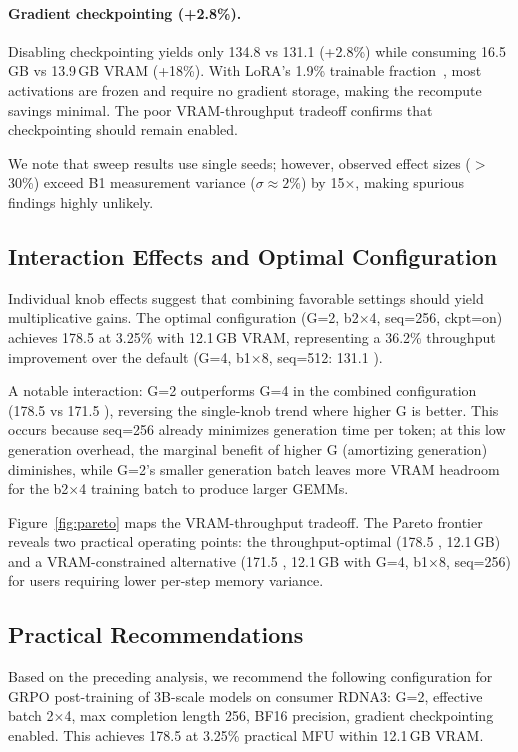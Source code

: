 \paragraph{Gradient checkpointing (+2.8\%).} Disabling checkpointing yields only 134.8 vs 131.1 \toksec{} (+2.8\%) while consuming 16.5\,GB vs 13.9\,GB VRAM (+18\%). With LoRA's 1.9\% trainable fraction~\citep{hu2022lora}, most activations are frozen and require no gradient storage, making the recompute savings minimal. The poor VRAM-throughput tradeoff confirms that checkpointing should remain enabled.

We note that sweep results use single seeds; however, observed effect sizes ($>$30\%) exceed B1 measurement variance ($\sigma \approx 2\%$) by 15$\times$, making spurious findings highly unlikely.

\subsection{Interaction Effects and Optimal Configuration}

Individual knob effects suggest that combining favorable settings should yield multiplicative gains. The optimal configuration (G=2, b2$\times$4, seq=256, ckpt=on) achieves 178.5 \toksec{} at 3.25\% \mfuprac{} with 12.1\,GB VRAM, representing a 36.2\% throughput improvement over the default (G=4, b1$\times$8, seq=512: 131.1 \toksec{}).

A notable interaction: G=2 outperforms G=4 in the combined configuration (178.5 vs 171.5 \toksec{}), reversing the single-knob trend where higher G is better. This occurs because seq=256 already minimizes generation time per token; at this low generation overhead, the marginal benefit of higher G (amortizing generation) diminishes, while G=2's smaller generation batch leaves more VRAM headroom for the b2$\times$4 training batch to produce larger GEMMs.

Figure~\ref{fig:pareto} maps the VRAM-throughput tradeoff. The Pareto frontier reveals two practical operating points: the throughput-optimal (178.5 \toksec{}, 12.1\,GB) and a VRAM-constrained alternative (171.5 \toksec{}, 12.1\,GB with G=4, b1$\times$8, seq=256) for users requiring lower per-step memory variance.

\subsection{Practical Recommendations}

Based on the preceding analysis, we recommend the following configuration for GRPO post-training of 3B-scale models on consumer RDNA3: G=2, effective batch 2$\times$4, max completion length 256, BF16 precision, gradient checkpointing enabled. This achieves 178.5 \toksec{} at 3.25\% practical MFU within 12.1\,GB VRAM.

